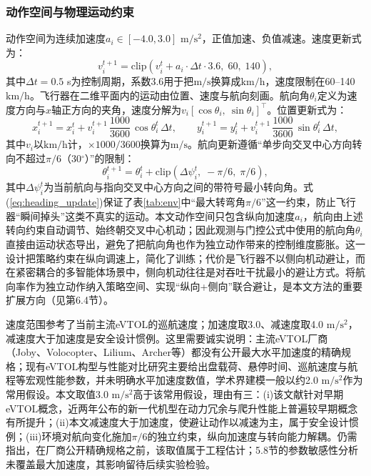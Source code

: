 \documentclass[12pt,a4paper,UTF8]{ctexart}
\begin{document}
\subsubsection{动作空间与物理运动约束}

动作空间为连续加速度$a_i\in[-4.0, 3.0]$ $\mathrm{m/s^2}$，正值加速、负值减速。速度更新式为：
\begin{equation}
    v_i^{t+1} = \text{clip}\!\left(v_i^{t} + a_i \cdot \Delta t \cdot 3.6,\; 60,\; 140\right),
    \label{eq:velocity_update}
\end{equation}
其中$\Delta t=0.5$ s为控制周期，系数3.6用于把$\mathrm{m/s}$换算成$\mathrm{km/h}$，速度限制在60--140 $\mathrm{km/h}$。飞行器在二维平面内的运动由位置、速度与航向刻画。航向角$\theta_i$定义为速度方向与$x$轴正方向的夹角，速度分解为$v_i[\cos\theta_i,\ \sin\theta_i]^{\top}$。位置更新式为：
\begin{equation}
    x_i^{t+1} = x_i^{t} + v_i^{t+1}\,\frac{1000}{3600}\,\cos\theta_i^{t}\,\Delta t,\qquad
    y_i^{t+1} = y_i^{t} + v_i^{t+1}\,\frac{1000}{3600}\,\sin\theta_i^{t}\,\Delta t,
    \label{eq:position_update}
\end{equation}
其中$v_i$以$\mathrm{km/h}$计，$\times1000/3600$换算为$\mathrm{m/s}$。航向更新遵循“单步向交叉中心方向转向不超过$\pi/6$（30$^{\circ}$）”的限制：
\begin{equation}
    \theta_i^{t+1} = \theta_i^{t} + \text{clip}\!\left(\Delta\psi_i^{t},\; -\pi/6,\; \pi/6\right),
    \label{eq:heading_update}
\end{equation}
其中$\Delta\psi_i^{t}$为当前航向与指向交叉中心方向之间的带符号最小转向角。式(\ref{eq:heading_update})保证了表\ref{tab:env}中“最大转弯角$\pi/6$”这一约束，防止飞行器“瞬间掉头”这类不真实的运动。本文动作空间只包含纵向加速度$a_i$，航向由上述转向约束自动调节、始终朝交叉中心机动；因此观测与门控公式中使用的航向角$\theta_i$直接由运动状态导出，避免了把航向角也作为独立动作带来的控制维度膨胀。这一设计把策略约束在纵向调速上，简化了训练；代价是飞行器不以侧向机动避让，而在紧密耦合的多智能体场景中，侧向机动往往是对吞吐干扰最小的避让方式。将航向率作为独立动作纳入策略空间、实现“纵向+侧向”联合避让，是本文方法的重要扩展方向（见第6.4节）。

速度范围参考了当前主流eVTOL的巡航速度；加速度取3.0、减速度取4.0 $\mathrm{m/s^2}$，减速度大于加速度是安全设计惯例。这里需要诚实说明：主流eVTOL厂商（Joby、Volocopter、Lilium、Archer等）都没有公开最大水平加速度的精确规格；现有eVTOL构型与性能对比研究\cite{ref25}主要给出盘载荷、悬停时间、巡航速度与航程等宏观性能参数，并未明确水平加速度数值，学术界建模一般以约2.0 $\mathrm{m/s^2}$作为常用假设。本文取值3.0 $\mathrm{m/s^2}$高于该常用假设，理由有三：(i)该文献针对早期eVTOL概念，近两年公布的新一代机型在动力冗余与爬升性能上普遍较早期概念有所提升；(ii)本文减速度大于加速度，使避让动作以减速为主，属于安全设计惯例；(iii)环境对航向变化施加$\pi/6$的独立约束，纵向加速度与转向能力解耦。仍需指出，在厂商公开精确规格之前，该取值属于工程估计；5.8节的参数敏感性分析未覆盖最大加速度，其影响留待后续实验检验。
\end{document}
